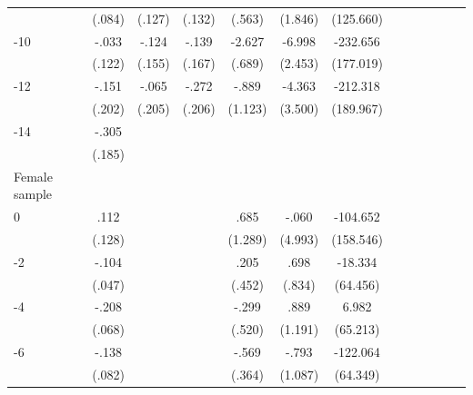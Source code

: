 \begin{table}[p]
\begin{adjustbox}{max width=\linewidth}
\begin{threeparttable}
{\begin{tabular}{l*{6}{S
S}}
                &   (.084)         &   (.127)         &   (.132)         &   (.563)         &  (1.846)         &(125.660)         \\
-10            &    -.033         &    -.124         &    -.139         &   -2.627\sym{***}&   -6.998\sym{***}& -232.656         \\
                &   (.122)         &   (.155)         &   (.167)         &   (.689)         &  (2.453)         &(177.019)         \\
-12           &    -.151         &    -.065         &    -.272         &    -.889         &   -4.363         & -212.318         \\
                &   (.202)         &   (.205)         &   (.206)         &  (1.123)         &  (3.500)         &(189.967)         \\
-14           &    -.305\sym{*}  &                  &                  &                  &                  &                  \\
                &   (.185)         &                  &                  &                  &                  &                  \\
\midrule
Female sample &&&&&&\\
0               &     .112         &         &         &     .685         &    -.060         & -104.652         \\
                &   (.128)         &         &         &  (1.289)         &  (4.993)         &(158.546)         \\
-2             &    -.104\sym{**} &         &         &     .205         &     .698         &  -18.334         \\
                &   (.047)         &         &         &   (.452)         &   (.834)         & (64.456)         \\
-4             &    -.208\sym{***}&         &         &    -.299         &     .889         &    6.982         \\
                &   (.068)         &         &         &   (.520)         &  (1.191)         & (65.213)         \\
-6             &    -.138\sym{*}  &         &         &    -.569         &    -.793         & -122.064\sym{*}  \\
                &   (.082)         &         &         &   (.364)         &  (1.087)         & (64.349)         \\

\end{tabular}}
\end{threeparttable}
\end{adjustbox}
\end{table}
